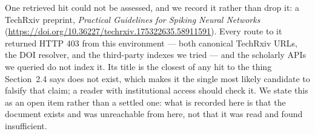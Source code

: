\documentclass[11pt]{article}
\begin{document}
\begin{sloppypar}
One retrieved hit could not be assessed, and we record it rather than drop it: a
TechRxiv preprint, \emph{Practical Guidelines for Spiking Neural Networks}
(\url{https://doi.org/10.36227/techrxiv.175322635.58911591}). Every route to it
returned HTTP 403 from this environment --- both canonical TechRxiv URLs, the DOI
resolver, and
the third-party indexes we tried --- and the scholarly APIs we queried do not
index it. Its title is the closest of any hit to the thing Section~2.4 says does
not exist, which makes it the single most likely candidate to falsify that claim;
a reader with institutional access should check it. We state this as an open item
rather than a settled one: what is recorded here is that the document exists and
was unreachable from here, not that it was read and found insufficient.
\end{sloppypar}
\end{document}
